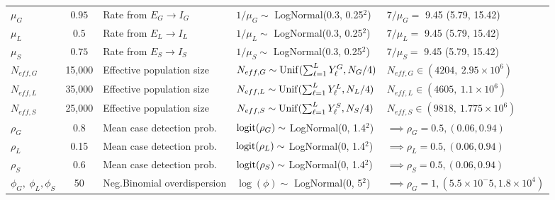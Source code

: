 \begin{table}
\begin{fullpage}
\begin{tabular}{lclll}
		$ \mu_G $ & $ 0.95 $ & Rate from $ E_G\rightarrow I_G $ & $ 1/\mu_G\sim $ LogNormal(0.3, 0.25$ ^2 $) & $ 7/\mu_G = $ 9.45 (5.79, 15.42) \\
		$ \mu_L $ & $ 0.5 $ & Rate from $ E_L\rightarrow I_L $ & $ 1/\mu_L\sim $ LogNormal(0.3, 0.25$ ^2 $) & $ 7/\mu_L = $ 9.45 (5.79, 15.42) \\
		$ \mu_S $ & $ 0.75 $ & Rate from $ E_S\rightarrow I_S $ & $ 1/\mu_S\sim $ LogNormal(0.3, 0.25$ ^2 $) & $ 7/\mu_S = $ 9.45 (5.79, 15.42) \\
		$ N_{eff,G} $ & 15,000 & Effective population size & $ N_{eff,G}\sim\mathrm{Unif}(\sum_{\ell=1}^{L}Y_\ell^G, N_G/4) $& $ N_{eff,G} \in (4204,\ 2.95\times10^6) $ \\
		$ N_{eff,L} $ & 35,000 & Effective population size & $ N_{eff,L}\sim\mathrm{Unif}(\sum_{\ell=1}^{L}Y_\ell^L, N_L/4) $& $ N_{eff,L} \in (4605,\ 1.1\times10^6) $ \\
		$ N_{eff,S} $ & 25,000 & Effective population size & $ N_{eff,S}\sim\mathrm{Unif}(\sum_{\ell=1}^{L}Y_\ell^S, N_S/4) $& $ N_{eff,S} \in (9818,\ 1.775\times10^6) $ \\
		$ \rho_G $ & 0.8 & Mean case detection prob. & $ \mathrm{logit}(\rho_G) \sim $ LogNormal(0, 1.4$ ^2 $) & $ \implies \rho_G = 0.5, (0.06, 0.94)$ \\
		$ \rho_L $ & 0.15 & Mean case detection prob. & $ \mathrm{logit}(\rho_L) \sim $ LogNormal(0, 1.4$ ^2 $) & $ \implies \rho_L = 0.5, (0.06, 0.94)$ \\
		$ \rho_S $ & 0.6 & Mean case detection prob. & $ \mathrm{logit}(\rho_S) \sim $ LogNormal(0, 1.4$ ^2 $) & $ \implies \rho_S = 0.5, (0.06, 0.94)$ \\
		$ \phi_G,\ \phi_L, \phi_S $ & 50 & Neg.Binomial overdispersion & $ \log(\phi) \sim $ LogNormal(0, 5$ ^2 $) & $ \implies \rho_G = 1, (5.5\times 10^-5, 1.8\times10^4)$ \\
		\hline
	\end{tabular}
	\end{fullpage}
\end{table}

